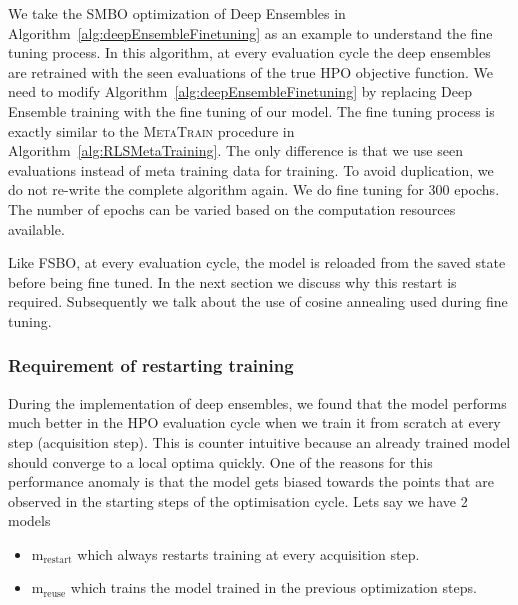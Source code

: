 \documentclass[12pt, twoside, ngerman]{report}
\begin{document}
We take the SMBO optimization of Deep Ensembles in Algorithm~\ref{alg:deepEnsembleFinetuning} as an example to understand the fine tuning process.
In this algorithm,  at every evaluation cycle the deep ensembles are retrained with the seen evaluations of the true HPO objective function.
We need to modify Algorithm~\ref{alg:deepEnsembleFinetuning} by replacing Deep Ensemble training with the fine tuning of our model.
The fine tuning  process is exactly similar to the \textsc{MetaTrain} procedure in Algorithm~\ref{alg:RLSMetaTraining}.
The only difference is that we use seen evaluations instead of meta training data for training.
To avoid duplication,  we do not re-write the complete algorithm again.
We do fine tuning for 300 epochs.
The number of epochs can be varied based on the computation resources available.

Like FSBO,  at every evaluation cycle,  the model is reloaded from the saved state before being fine tuned.
In the next section we discuss why this restart is required.
Subsequently we talk about the use of cosine annealing used during fine tuning.

\subsubsection{Requirement of restarting training}\label{sec:restart}

During the implementation of deep ensembles,  we found that the model performs much better in the HPO evaluation cycle when we train it from scratch at every step (acquisition step).
This is counter intuitive because an already trained model should converge to a local optima quickly.
One of the reasons for this performance anomaly is that the model gets biased towards the points that are observed in the starting steps of the optimisation cycle.
Lets say we have 2 models 
\begin{itemize}
\item $\textrm{m}_{\textrm{restart}}$ which always restarts training at every acquisition step.
\item $\textrm{m}_{\textrm{reuse}}$ which trains the model trained in the previous optimization steps.
\end{itemize}
\end{document}
